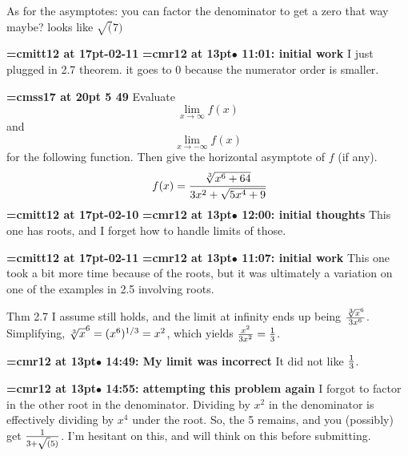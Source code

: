 As for the asymptotes: you can factor the denominator to get a zero that way maybe? looks like $\sqrt(7)$
\par

{\medskip\noindent\bf\font\titlefont=cmitt12 at 17pt-02-11}\medskip
{\smallskip\noindent\bf\font\titlefont=cmr12 at 13pt\titlefont $\bullet$ 11:01: initial work}\smallskip
I just plugged in 2.7 theorem. it goes to 0 because the numerator order is smaller.
\par

{\medskip\noindent\bf\font\titlefont=cmss17 at 20pt 5 49}\medskip
Evaluate
$$\lim_{x \to \infty}{f(x)}$$
and
$$\lim_{x \to -\infty}{f(x)}$$
for the following function. Then give the
horizontal asymptote of $f$ (if any).
$$\
f(x) = {
\root 3 \of {x^6 + 64}
\over
3x^2 + \sqrt {5x^4 + 9}
}
$$
{\medskip\noindent\bf\font\titlefont=cmitt12 at 17pt-02-10}\medskip
{\smallskip\noindent\bf\font\titlefont=cmr12 at 13pt\titlefont $\bullet$ 12:00: initial thoughts}\smallskip
This one has roots, and I forget how to handle limits of those.
\par

{\medskip\noindent\bf\font\titlefont=cmitt12 at 17pt-02-11}\medskip
{\smallskip\noindent\bf\font\titlefont=cmr12 at 13pt\titlefont $\bullet$ 11:07: initial work}\smallskip
This one took a bit more time because of the roots, but it was ultimately a variation on one of the examples in 2.5 involving roots.
\par

Thm 2.7 I assume still holds, and the limit at infinity ends up being ${\root 3 \of x^6 \over 3x^6}$. Simplifying, ${\root 3 \of x^6} = (x^6)^{1/3}=x^2$, which yields ${x^2 \over 3x^2} = {1 \over 3}$.
\par

{\smallskip\noindent\bf\font\titlefont=cmr12 at 13pt\titlefont $\bullet$ 14:49: My limit was incorrect}\smallskip
It did not like ${1 \over 3}$.
\par

{\smallskip\noindent\bf\font\titlefont=cmr12 at 13pt\titlefont $\bullet$ 14:55: attempting this problem again}\smallskip
I forgot to factor in the other root in the denominator. Dividing by $x^2$ in the denominator is effectively dividing by $x^4$ under the root. So, the 5 remains, and you (possibly) get $1 \over {3 + \sqrt(5)}$. I'm hesitant on this, and will think on this before submitting.
\par

